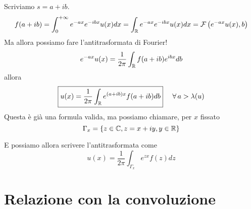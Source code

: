 Scriviamo $s = a + ib$.
\begin{equation*}
f(a + ib) = \int^{+ \infty}_{0} e^{- ax} e^{- ibx} u(x) dx = \int_{\mathbb{R}} e^{- ax} e^{- ibx} u(x) dx = \mathcal{F}\left(e^{- ax} u(x), b\right)
\end{equation*}
Ma allora possiamo fare l'antitrasformata di Fourier!
\begin{equation*}
e^{- ax} u(x) = \frac{1}{2\pi}\int_{\mathbb{R}} f(a + ib) e^{ibx} db
\end{equation*}
allora
\begin{equation*}
\boxed{u(x) = \frac{1}{2\pi}\int_{\RR} e^{(a + ib) x} f(a + ib) db} \ \ \ \ \forall a > \lambda (u)
\end{equation*}
Questa è già una formula valida, ma possiamo chiamare, per $x$ fissato
\begin{equation*}
\Gamma_{x} = \{z\in \mathbb{C}, z = x + iy, y\in \mathbb{R}\}
\end{equation*}

\begin{figure}[htpb]
\centering
{} %

\end{figure}
\FloatBarrier

E possiamo allora scrivere l'antitrasformata come
\begin{equation*}
\boxed{u(x) = \frac{1}{2\pi}\int_{\Gamma_{x}} e^{zx} f(z) dz}
\end{equation*}

\section{Relazione con la convoluzione}

